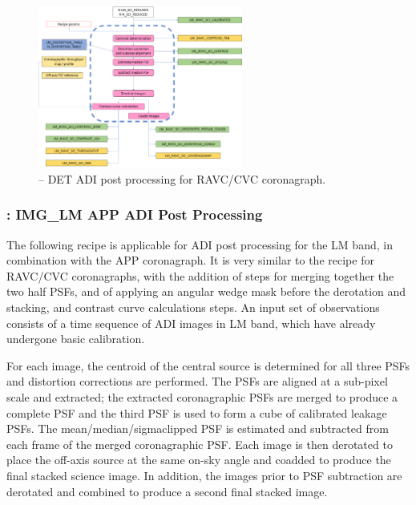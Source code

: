 \begin{figure}[hb]
  \centering
  \includegraphics[width=0.6\textwidth]{./figures/metis_lm_adi_ravc}
  \caption[Recipe: ]{\hyperref[rec:metis_img_adi_cgrph]{} -- DET ADI post processing for RAVC/CVC coronagraph.
    }
  \label{fig:metis_det_adi_ravc}
\end{figure}


\subsubsection{: IMG\_LM APP ADI Post Processing}
\label{sssec:adi_img_app}


The following recipe is applicable for ADI post processing for the LM
band, in combination with the APP coronagraph. It is very
similar to the recipe for RAVC/CVC coronagraphs, with the
addition of steps for merging together the two half PSFs, and of
applying an angular wedge mask before the derotation and stacking, and
contrast curve calculations steps. An input set of observations
consists of a time sequence of ADI images in LM band, which have
already undergone basic calibration.

For each image, the centroid of the central source is determined for
all three PSFs and distortion corrections are performed. The PSFs are
aligned at a sub-pixel scale and extracted; the extracted
coronagraphic PSFs are merged to produce a complete PSF and the third
PSF is used to form a cube of calibrated leakage PSFs.  The
mean/median/sigmaclipped PSF is estimated and subtracted from each
frame of the merged coronagraphic PSF. Each image is then derotated to
place the off-axis source at the same on-sky angle and coadded to
produce the final stacked science image. In addition, the images prior
to PSF subtraction are derotated and combined to produce a second
final stacked image.

